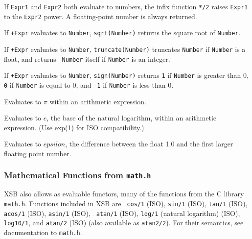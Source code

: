 \begin{description}
%
If {\tt Expr1} and {\tt Expr2} both evaluate to numbers, the infix
function {\tt **/2} raises {\tt Expr1} to the {\tt Expr2} power.  A
floating-point number is always returned.

%
If {\tt +Expr} evaluates to {\tt Number}, {\tt sqrt(Number)}
returns the square root of {\tt Number}.

%
If {\tt +Expr} evaluates to {\tt Number}, {\tt truncate(Number)}
truncates {\tt Number} if {\tt Number} is a float, and returns {\tt
  Number} itself if {\tt Number} is an integer.

%
If {\tt +Expr} evaluates to {\tt Number}, {\tt sign(Number)} returns
{\tt 1} if {\tt Number} is greater than 0, {\tt 0} if {\tt Number} is
equal to 0, and {\tt -1} if {\tt Number} is less than 0.

% 
Evaluates to $\pi$ within an arithmetic expression.

% 
Evaluates to $e$, the base of the natural logarithm, within an
arithmetic expression.  (Use exp(1) for ISO compatibility.)

% 
Evaluates to $epsilon$, the difference between the float 1.0 and 
the first larger floating point number.

\end{description}

\subsubsection{Mathematical Functions from {\tt math.h}}
  
  
  

XSB also allows as evaluable functors, many of the functions from the
C library {\tt math.h}.  Functions included in XSB \version{} are {\tt
  cos/1} (ISO), {\tt sin/1} (ISO), {\tt tan/1} (ISO), {\tt acos/1} (ISO), {\tt asin/1} (ISO), {\tt
  atan/1} (ISO), {\tt log/1} (natural logarithm) (ISO), {\tt log10/1}, and 
  {\tt atan/2} (ISO) (also available as {\tt atan2/2}).  For
  their semantics, see documentation to {\tt math.h}.

